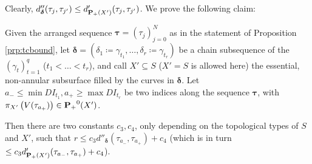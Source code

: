 Clearly, $d''_{\bm\delta}(\tau_j,\tau_{j'})\leq d'_{{\mathbf{P}_+}(X')}(\tau_j,\tau_{j'})$. We prove the following claim: 
\begin{claim}
Given the arranged sequence $\bm\tau=(\tau_j)_{j=0}^N$ as in the statement of Proposition \ref{prp:tcbound}, let $\bm\delta=(\delta_1\coloneqq\gamma_{t_1},\ldots,\delta_r\coloneqq\gamma_{t_r})$ be a chain subsequence of the $(\gamma_t)_{t=1}^q$ ($t_1<\ldots<t_r$), and call $X' \subseteq S$ ($X'=S$ is allowed here) the essential, non-annular subsurface filled by the curves in $\bm\delta$. Let $a_-\leq \min DI_{t_1}, a_+\geq \max DI_{t_r}$ be two indices along the sequence $\bm\tau$, with $\pi_{X'}\left(V(\tau_{a_+})\right) \in {\mathbf{P}_+}^0(X')$.

Then there are two constants $c_3, c_4$, only depending on the topological types of $S$ and $X'$, such that $r\leq c_3 d''_{\bm\delta}(\tau_{a_-},\tau_{a_+})+c_4$ (which is in turn $\leq c_3 d'_{{\mathbf{P}_+}(X')}(\tau_{a_-},\tau_{a_+})+c_4$).
\end{claim}
